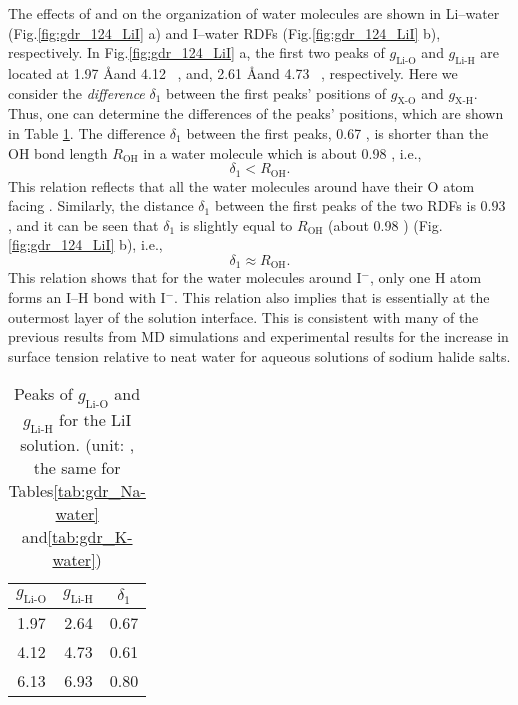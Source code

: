 The effects of \Li and \I on the organization of water molecules are shown in Li--water (Fig.\thinspace\ref{fig:gdr_124_LiI} a) 
and I--water RDFs (Fig.\thinspace\ref{fig:gdr_124_LiI} b), respectively.  
In Fig.\thinspace\ref{fig:gdr_124_LiI} a, the first two peaks of $g_{\text{Li-O}}$ and $g_{\text{Li-H}}$ are located at 1.97 \AA and 4.12 \ \A,  
and, 2.61 \AA and 4.73 \ \A, respectively. 
Here we consider the \emph{difference} $\delta_1$ between the first peaks' positions of $g_{\text{X-O}}$ and $g_{\text{X-H}}$. 
Thus, one can determine the differences of the peaks' positions, which are shown in Table \ref{tab:gdr_Li-water}. 
The difference $\delta_1$ between the first peaks, 0.67 \A, is shorter than the OH bond length $R_{\text{OH}}$ in a water molecule which is about 0.98 \A, i.e.,
\begin{equation}
\delta_1 < R_{\text{OH}}.
\label{lt_OH}
\end{equation}
This relation reflects that all the water molecules around \Li have their O atom facing \li. 
Similarly, the distance $\delta_1$ between the first peaks of the 
two RDFs is $0.93$ \A, and it can be seen that $\delta_1$ is slightly equal to $R_{\text{OH}}$ (about 0.98 \A)
(Fig.\thinspace\ref{fig:gdr_124_LiI} b), i.e., 
\begin{equation}
\delta_1 \approx R_{\text{OH}}.
\label{almost_OH}
\end{equation}
This relation shows that for the water molecules around I$^-$, only one H atom forms an I--H bond with I$^-$. 
This relation also implies that \I is essentially at the outermost layer of the solution interface. 
This is consistent with many of the previous results from MD simulations\cite{Dang2002,Jungwirth2001} 
and experimental results for the increase in surface tension relative to neat water for aqueous solutions of sodium halide salts\cite{Jungwirth2002,Vrbka2004,Garrett2004,Bajaj2016}.
\begin{table}[htbp] %
\centering
\caption{\label{tab:gdr_Li-water} 
Peaks of $g_{\text{Li-O}}$ and $g_{\text{Li-H}}$ for the LiI solution. (unit: \A, the same for Tables\thinspace\ref{tab:gdr_Na-water} and\thinspace\ref{tab:gdr_K-water})}
\begin{tabular}{ccc} %
  $g_{\text{Li-O}}$& $g_{\text{Li-H}}$ & $\delta_1$  \\
\hline
 1.97 & 2.64 & 0.67 \\
 4.12&4.73  &0.61  \\
 6.13 &6.93 & 0.80 
\end{tabular}
\end{table}
